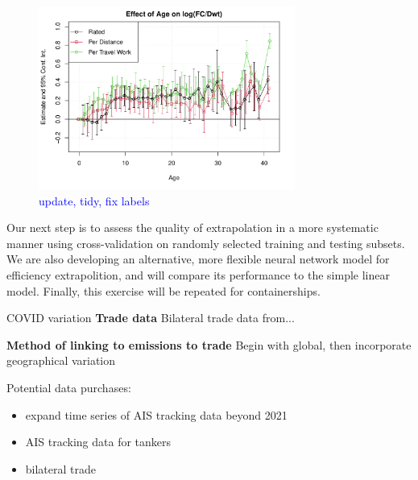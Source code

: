 \documentclass[hidelinks, 12pt,letterpaper]{article}
\begin{document}
\begin{figure}[h]
  \centering
  \includegraphics[width = 0.75\textwidth]{Efficiency_Regression_Size_Age_Coeffs_3.pdf}
  \caption{\textcolor{blue}{update, tidy, fix labels}}
  \label{fig:efficiency}
\end{figure}

Our next step is to assess the quality of extrapolation in a more systematic manner using cross-validation on randomly selected training and testing subsets. We are also developing an alternative, more flexible neural network model for efficiency extrapolition, and will compare its performance to the simple linear model. Finally, this exercise will be repeated for containerships.

COVID variation
\textbf{Trade data} Bilateral trade data from...

\textbf{Method of linking to emissions to trade}
Begin with global, then incorporate geographical variation


\pagebreak
Potential data purchases:
\begin{itemize}
  \item expand time series of AIS tracking data beyond 2021
  \item AIS tracking data for tankers
  \item bilateral trade
\end{itemize}

\pagebreak

\singlespace{

}
\end{document}
